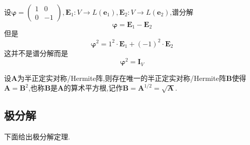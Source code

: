 \begin{brown}
    \begin{example}
        设$\bm{\varphi}=\begin{pmatrix}
            1&0\\0&-1
        \end{pmatrix},\bm{E}_1:V\longrightarrow L\left(\bm{e}_1\right),\bm{E}_2:V\longrightarrow L\left(\bm{e}_2\right)$,谱分解\[
        \bm{\varphi}=\bm{E}_1-\bm{E}_2
        \]但是\[
        \bm{\varphi}^2=1^2\cdot\bm{E}_1+\left(-1\right)^2\cdot\bm{E}_2
        \]这并不是谱分解而是\[
        \bm{\varphi}^2=\bm{I}_V
        \]
    \end{example}
\end{brown}
\begin{green}
    \begin{corollary}\label{cor:半正定实对称/Hermite阵的平方根}
        设$\bm{A}$为半正定实对称/\textup{Hermite}阵,则存在唯一的半正定实对称/\textup{Hermite}阵$\bm{B}$使得$\bm{A}=\bm{B}^2$,也称$\bm{B}$是$\bm{A}$的算术平方根,记作$\bm{B}=\bm{A}^{1/2}=\sqrt{\bm{A}}$.
    \end{corollary}
\end{green}
\subsection{极分解}
下面给出极分解定理.

